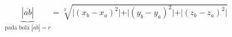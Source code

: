 \noindent \begin{align}\label{equ:bola}
	\underbrace{|\overline{ab}|}_{\text{pada bola $|\overline{ab}| = r$}}
	= \sqrt[2]{\vert(x_{b} - x_{a})^{2}\vert + \vert(y_{b} - y_{a})^{2}\vert +
		\vert(z_{b} - z_{a})^{2}\vert}
\end{align}

